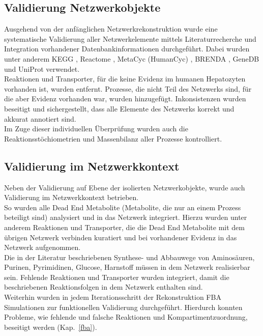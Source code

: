 \subsection{Validierung Netzwerkobjekte}
Ausgehend von der anfänglichen Netzwerkrekonstruktion wurde eine systematische Validierung aller Netzwerkelemente mittels Literaturrecherche und Integration vorhandener Datenbankinformationen durchgeführt. Dabei wurden unter anderem KEGG \cite{Kanehisa2000}, Reactome \cite{Matthews2009}, MetaCyc (HumanCyc) \cite{Caspi2009}, BRENDA \cite{Chang2009}, GeneDB \cite{Hertz-Fowler2004} und UniProt \cite{Consortium2009} verwendet.\\
Reaktionen und Transporter, für die keine Evidenz im humanen Hepatozyten vorhanden ist, wurden entfernt. Prozesse, die nicht Teil des Netzwerks sind, für die aber Evidenz vorhanden war, wurden hinzugefügt. Inkonsistenzen wurden beseitigt und sichergestellt, dass alle Elemente des Netzwerks korrekt und akkurat annotiert sind.\\
Im Zuge dieser individuellen Überprüfung wurden auch die Reaktionsstöchiometrien und Massenbilanz aller Prozesse kontrolliert.

\subsection{Validierung im Netzwerkkontext}
Neben der Validierung auf Ebene der isolierten Netzwerkobjekte, wurde auch Validierung im Netzwerkkontext betrieben.\\
So wurden alle Dead End Metabolite (Metabolite, die nur an einem Prozess beteiligt sind) analysiert und in das Netzwerk integriert. Hierzu wurden unter anderem Reaktionen und Transporter, die die Dead End Metabolite mit dem übrigen Netzwerk verbinden kuratiert und bei vorhandener Evidenz in das Netzwerk aufgenommen.\\
Die in der Literatur beschriebenen Synthese- und Abbauwege von Aminosäuren, Purinen, Pyrimidinen, Glucose, Harnstoff müssen in dem Netzwerk realisierbar sein. Fehlende Reaktionen und Transporter wurden integriert, damit die beschriebenen Reaktionsfolgen in dem Netzwerk enthalten sind.\\
Weiterhin wurden in jedem Iterationsschritt der Rekonstruktion FBA Simulationen zur funktionellen Validierung durchgeführt.
Hierdurch konnten Probleme, wie fehlende und falsche Reaktionen und Kompartimentzuordnung, beseitigt werden (Kap.~\ref{fba}).

